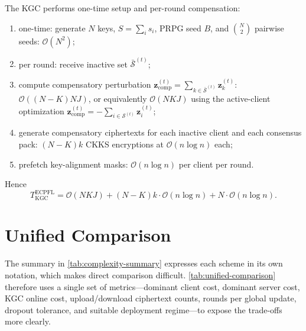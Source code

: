 \documentclass[a4paper,11pt]{article}
\begin{document}
The KGC performs one-time setup and per-round compensation:
\begin{enumerate}
    \item one-time: generate $N$ keys, $S=\sum_i s_i$, PRPG seed $B$, and $\binom{N}{2}$ pairwise seeds: $\mathcal{O}(N^2)$;
    \item per round: receive inactive set $\bar{\mathcal{S}}^{(t)}$;
    \item compute compensatory perturbation $\mathbf{z}_{\mathrm{comp}}^{(t)}=\sum_{k\in\bar{\mathcal{S}}^{(t)}}\mathbf{z}_k^{(t)}$: $\mathcal{O}((N-K)NJ)$, or equivalently $\mathcal{O}(NKJ)$ using the active-client optimization $\mathbf{z}_{\mathrm{comp}}^{(t)}=-\sum_{i\in\mathcal{S}^{(t)}}\mathbf{z}_i^{(t)}$;
    \item generate compensatory ciphertexts for each inactive client and each consensus pack: $(N-K)k$ CKKS encryptions at $\mathcal{O}(n\log n)$ each;
    \item prefetch key-alignment masks: $\mathcal{O}(n\log n)$ per client per round.
\end{enumerate}
Hence
\begin{equation}
\boxed{T_{\text{KGC}}^{\text{ECPFL}} = \mathcal{O}(NKJ) + (N-K)k\cdot\mathcal{O}(n\log n) + N\cdot\mathcal{O}(n\log n).}
\end{equation}

\section{Unified Comparison}
\label{sec:unified}

The summary in \cref{tab:complexity-summary} expresses each scheme in its own notation, which makes direct comparison difficult. \cref{tab:unified-comparison} therefore uses a single set of metrics---dominant client cost, dominant server cost, KGC online cost, upload/download ciphertext counts, rounds per global update, dropout tolerance, and suitable deployment regime---to expose the trade-offs more clearly.
\end{document}
